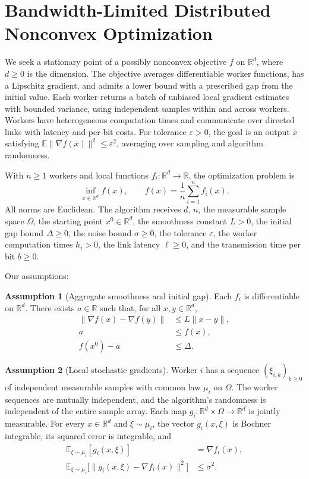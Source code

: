 \documentclass[10pt]{article}
\theoremstyle{definition}
\newtheorem{assumption}{Assumption}
\begin{document}
\section*{Bandwidth-Limited Distributed Nonconvex Optimization}
We seek a stationary point of a possibly nonconvex objective $f$ on $\mathbb{R}^d$, where $d\geq 0$ is the dimension. The objective averages differentiable worker functions, has a Lipschitz gradient, and admits a lower bound with a prescribed gap from the initial value. Each worker returns a batch of unbiased local gradient estimates with bounded variance, using independent samples within and across workers. Workers have heterogeneous computation times and communicate over directed links with latency and per-bit costs. For tolerance $\varepsilon>0$, the goal is an output $\bar{x}$ satisfying $\mathbb{E}\|\nabla f(\bar{x})\|^2\leq\varepsilon^2$, averaging over sampling and algorithm randomness.

With $n\geq 1$ workers and local functions $f_i:\mathbb{R}^d\to\mathbb{R}$, the optimization problem is
\[
\inf_{x\in\mathbb{R}^d} f(x),
\qquad f(x)=\frac{1}{n}\sum_{i=1}^n f_i(x).
\]
All norms are Euclidean. The algorithm receives $d$, $n$, the measurable sample space $\Omega$, the starting point $x^0\in\mathbb{R}^d$, the smoothness constant $L>0$, the initial gap bound $\Delta\geq 0$, the noise bound $\sigma\geq 0$, the tolerance $\varepsilon$, the worker computation times $h_i>0$, the link latency $\ell\geq 0$, and the transmission time per bit $b\geq 0$.

Our assumptions:
\begin{assumption}[Aggregate smoothness and initial gap]
Each $f_i$ is differentiable on $\mathbb{R}^d$. There exists $a\in\mathbb{R}$ such that, for all $x,y\in\mathbb{R}^d$,
\[
\begin{aligned}
\|\nabla f(x)-\nabla f(y)\| &\leq L\|x-y\|,\\
a &\leq f(x),\\
f(x^0)-a &\leq \Delta.
\end{aligned}
\]
\end{assumption}

\begin{assumption}[Local stochastic gradients]
Worker $i$ has a sequence $(\xi_{i,k})_{k\geq 0}$ of independent measurable samples with common law $\mu_i$ on $\Omega$. The worker sequences are mutually independent, and the algorithm's randomness is independent of the entire sample array. Each map $g_i:\mathbb{R}^d\times\Omega\to\mathbb{R}^d$ is jointly measurable. For every $x\in\mathbb{R}^d$ and $\xi\sim\mu_i$, the vector $g_i(x,\xi)$ is Bochner integrable, its squared error is integrable, and
\[
\begin{aligned}
\mathbb{E}_{\xi\sim\mu_i}[g_i(x,\xi)] &= \nabla f_i(x),\\
\mathbb{E}_{\xi\sim\mu_i}\bigl[\|g_i(x,\xi)-\nabla f_i(x)\|^2\bigr] &\leq \sigma^2.
\end{aligned}
\]
\end{assumption}
\end{document}
